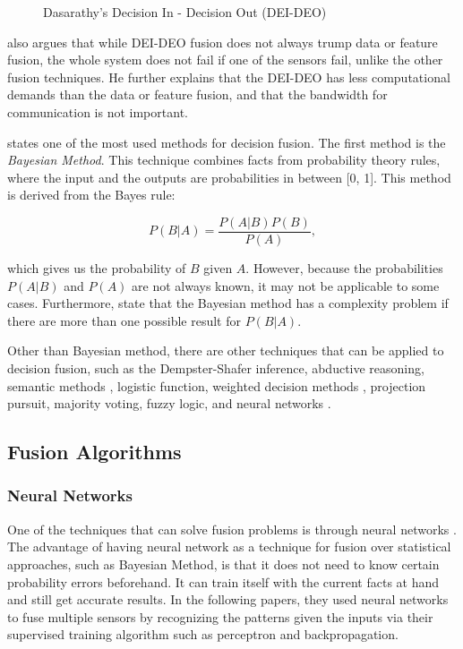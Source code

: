\begin{figure}[h]
	\centering
	\captionsetup{justification=centering}
	\caption{Dasarathy’s Decision In - Decision Out (DEI-DEO)}
	\label{fig:dei-deo}
\end{figure}

 also argues that while DEI-DEO fusion does not always trump data or feature fusion, the whole system does not fail if one of the sensors fail, unlike the other fusion techniques. He further explains that the DEI-DEO has less computational demands than the data or feature fusion, and that the bandwidth for communication is not important.

 states one of the most used methods for decision fusion. The first method is the \textit{Bayesian Method}. This technique combines facts from probability theory rules, where the input and the outputs are probabilities in between [0, 1]. This method is derived from the Bayes rule: 

\begin{equation}
P(B | A) = \frac{P(A | B) P(B)}{P(A)},
\end{equation}

\noindent which gives us the probability of $B$ given $A$. However, because the probabilities $P(A | B)$ and $P(A)$ are not always known, it may not be applicable to some cases. Furthermore,  state that the Bayesian method has a complexity problem if there are more than one possible result for $P(B | A)$. 

Other than Bayesian method, there are other techniques that can be applied to decision fusion, such as the Dempster-Shafer inference, abductive reasoning, semantic methods , logistic function, weighted decision methods , projection pursuit, majority voting, fuzzy logic, and neural networks . 


\subsection{Fusion Algorithms}
\subsubsection {Neural Networks}
One of the techniques that can solve fusion problems is through neural networks . The advantage of having neural network as a technique for fusion over statistical approaches, such as Bayesian Method, is that it does not need to know certain probability errors beforehand. It can train itself with the current facts at hand and still get accurate results.  In the following papers, they used neural networks to fuse multiple sensors by recognizing the patterns given the inputs via their supervised training algorithm such as perceptron and backpropagation.
 
